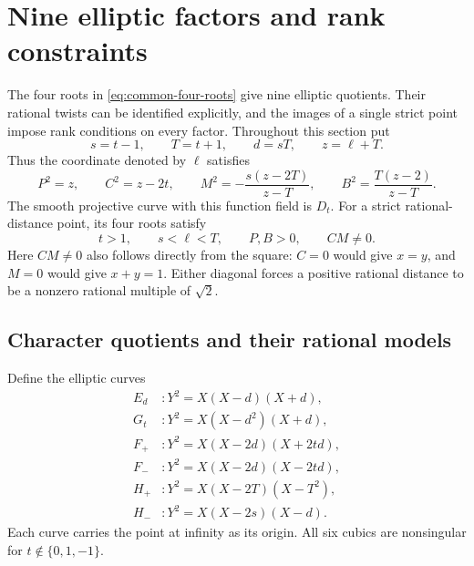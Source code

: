 \section{Nine elliptic factors and rank constraints}\label{sec:nine-factors}

The four roots in \eqref{eq:common-four-roots} give nine elliptic
quotients.  Their rational twists can be identified explicitly, and the
images of a single strict point impose rank conditions on every factor.
Throughout this section put
\[
 s=t-1,\qquad T=t+1,\qquad d=sT,\qquad z=\ell+T.
\]
Thus the coordinate denoted by $\ell$ satisfies
\begin{equation}\label{eq:nine-roots}
 P^2=z,\qquad C^2=z-2t,\qquad
 M^2=-\frac{s(z-2T)}{z-T},\qquad
 B^2=\frac{T(z-2)}{z-T}.
\end{equation}
The smooth projective curve with this function field is $D_t$.
For a strict rational-distance point, its four roots satisfy
\[
 t>1,\qquad s<\ell<T,\qquad P,B>0,\qquad CM\ne0.
\]
Here $CM\ne0$ also follows directly from the square: $C=0$ would give
$x=y$, and $M=0$ would give $x+y=1$.  Either diagonal forces a positive
rational distance to be a nonzero rational multiple of $\sqrt2$.

\subsection{Character quotients and their rational models}

Define the elliptic curves
\begin{equation}\label{eq:nine-elliptic-models}
\begin{aligned}
 E_d &: Y^2=X(X-d)(X+d),\\
 G_t &: Y^2=X(X-d^2)(X+d),\\
 F_+ &: Y^2=X(X-2d)(X+2td),\\
 F_- &: Y^2=X(X-2d)(X-2td),\\
 H_+ &: Y^2=X(X-2T)(X-T^2),\\
 H_- &: Y^2=X(X-2s)(X-d).
\end{aligned}
\end{equation}
Each curve carries the point at infinity as its origin.  All six cubics
are nonsingular for $t\notin\{0,1,-1\}$.


